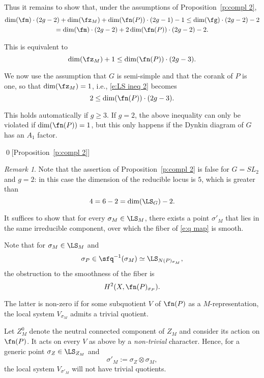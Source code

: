 \documentclass[9pt]{amsart}
\theoremstyle{remark}
\newtheorem{rem}[subsubsection]{Remark}
\theoremstyle{definition}
\theoremstyle{remark}
\newcommand{\lemref}[1]{Lemma~\ref{#1}}
\newcommand{\propref}[1]{Proposition~\ref{#1}}
\numberwithin{equation}{section}
\begin{document}
Thus it remains to show that, under the assumptions of \propref{p:compl 2}, 
\begin{multline} \label{e:LS ineq 1}
\dim(\fm)\cdot (2g-2)+\dim(\fz_M) + \dim(\fn(P))\cdot (2g-1)-1\leq \dim(\fg)\cdot (2g-2)-2 \\ 
=\dim(\fm) \cdot (2g-2) + 2\dim(\fn(P)) \cdot (2g-2) - 2.
\end{multline} 

This is equivalent to 
\begin{equation} \label{e:LS ineq 2}
\dim(\fz_M)+1 \leq 
\dim(\fn(P))\cdot(2g-3).
\end{equation} 

\sssec{}

We now use the assumption that $G$ is semi-simple and that the corank of $P$ is one, so that 
$\dim(\fz_M)=1$, i.e., \eqref{e:LS ineq 2} becomes
\begin{equation} \label{e:LS ineq 3}
2 \leq \dim(\fn(P))\cdot(2g-3).
\end{equation} 

This holds automatically if $g\geq 3$. If $g=2$, the above inequality can only be violated if $\dim(\fn(P))=1$,
but this only happens if the Dynkin diagram of $G$ has an $A_1$ factor.

\qed[\propref{p:compl 2}]

\begin{rem}
Note that the assertion of \propref{p:compl 2} is false for $G=SL_2$ and $g=2$: in this case the dimension
of the reducible locus is $5$, which is greater than 
$$4=6-2=\dim(\LS_G)-2.$$
\end{rem} 

\sssec{Proof of \lemref{l:LS P estim}(b)}

It suffices to show that for every $\sigma_M\in \LS_M$, there exists a point $\sigma'_M$ that lies in the same irreducible
component, over which the fiber of \eqref{e:q map} is smooth.

\medskip

Note that for $\sigma_M\in \LS_M$ and 
$$\sigma_P\in \sfq^{-1}(\sigma_M)\simeq \LS_{N(P)_{\sigma_M}},$$
the obstruction to the smoothness of the fiber is
$$H^2(X,\fn(P)_{\sigma_P}).$$

The latter is non-zero if for some subquotient $V$ of $\fn(P)$ as a $M$-representation, 
the local system $V_{\sigma_M}$ admits a trivial quotient. 

\medskip

Let $Z_M^0$ denote the neutral connected component 
of $Z_M$ and consider its action on $\fn(P)$. 
It acts on every $V$ as above by a \emph{non-trivial}
character. Hence, for a generic point $\sigma_Z\in \LS_{Z_M}$ and 
$$\sigma'_M:=\sigma_Z\otimes \sigma_M,$$
the local system $V_{\sigma'_M}$ will not have trivial quotients. 
\end{document}
